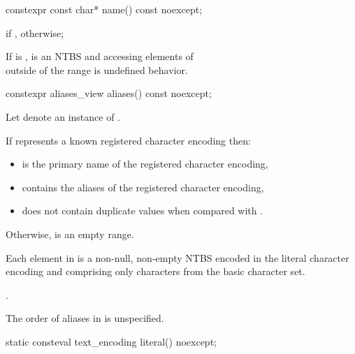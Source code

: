 \documentclass{wg21}
\begin{document}
\begin{addedblock}
\begin{itemdescr}
\end{itemdescr}

\begin{itemdecl}
constexpr const char* name() const noexcept;
\end{itemdecl}
\begin{itemdescr}
\returns {} if ,  otherwise;

\remarks
If  is ,  is an NTBS and accessing elements of\\
 outside of the range \tcode{name() + [0, strlen(name()) + 1)} is undefined behavior.
\end{itemdescr}

\begin{itemdecl}
constexpr aliases_view aliases() const noexcept;
\end{itemdecl}


\begin{itemdescr}

Let  denote an instance of .

\pnum If  represents a known registered character encoding then:
\begin{itemize}
    \item {} is the  primary name of the registered character encoding,
    \item {} contains the aliases of the registered character encoding,
    \item {} does not contain duplicate values when compared with .
\end{itemize}

Otherwise,  is an empty range.

Each element in  is a non-null, non-empty NTBS encoded in the literal character encoding and comprising only characters from the basic character set.

\returns {}.

\begin{note}
The order of aliases in  is unspecified.
\end{note}

\end{itemdescr}

\begin{itemdecl}
static consteval text_encoding literal() noexcept;
\end{itemdecl}
\begin{itemdescr}


\end{itemdescr}
\end{addedblock}
\end{document}
